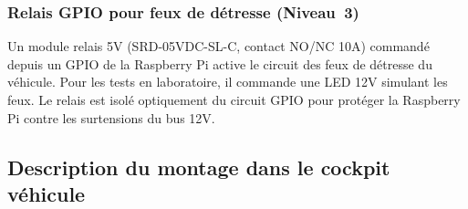 \documentclass[12pt,a4paper]{report}
\begin{document}
\subsubsection{Relais GPIO pour feux de d\'etresse (Niveau~3)}

Un module relais 5V (SRD-05VDC-SL-C, contact NO/NC 10A) command\'e depuis un GPIO de la Raspberry Pi active le circuit des feux de d\'etresse du v\'ehicule. Pour les tests en laboratoire, il commande une LED 12V simulant les feux. Le relais est isol\'e optiquement du circuit GPIO pour prot\'eger la Raspberry Pi contre les surtensions du bus 12V.

\subsection{Description du montage dans le cockpit v\'ehicule}
\end{document}

